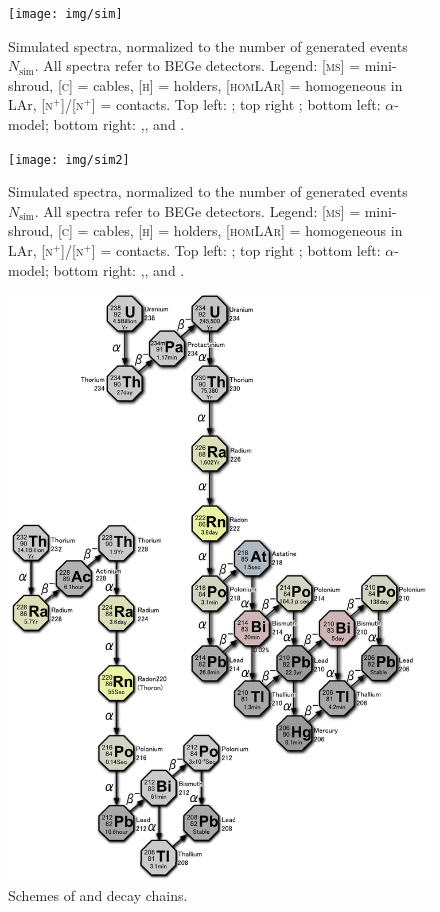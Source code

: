 \begin{landscape}
\begin{figure}
	\texttt{[image: img/sim]}
	\caption{Simulated spectra, normalized to the number of generated events $N_\text{sim}$. All spectra refer to BEGe detectors. Legend: \textsc{[ms]} = mini-shroud, \textsc{[c]} = cables, \textsc{[h]} = holders, \textsc{[homLAr]} = homogeneous in LAr, \textsc{[n$^+$]}/\textsc{[n$^+$]} = contacts. Top left: ; top right ; bottom left: $\alpha$-model; bottom right: ,, and .}
	\label{fig:simspectra}
\end{figure}
\end{landscape}
\begin{landscape}
\begin{figure}
	\texttt{[image: img/sim2]}
	\caption{Simulated spectra, normalized to the number of generated events $N_\text{sim}$. All spectra refer to BEGe detectors. Legend: \textsc{[ms]} = mini-shroud, \textsc{[c]} = cables, \textsc{[h]} = holders, \textsc{[homLAr]} = homogeneous in LAr, \textsc{[n$^+$]}/\textsc{[n$^+$]} = contacts. Top left: ; top right ; bottom left: $\alpha$-model; bottom right: ,, and .}
	\label{fig:simspectra2}
\end{figure}
\end{landscape}
	\begin{figure}
		\centerline{%
			\includegraphics[width=\linewidth]{img/chains.png}
		}
		\caption{Schemes of  and  decay chains.}\label{fig:chains}
	\end{figure}
